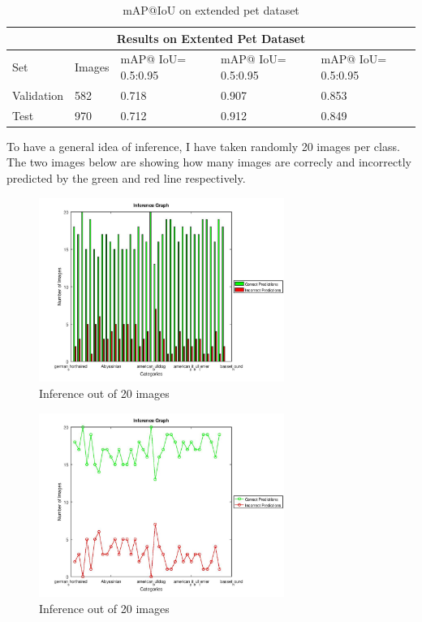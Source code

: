 \documentclass[10pt,twocolumn,letterpaper]{article}
\begin{document}
\begin{table}[h]
\begin{tabular}{ |p{1.5cm}||p{1cm}|p{1cm}|p{1cm}|p{1cm}|  }
 \hline
 \multicolumn{5}{|c|}{Results on Extented Pet Dataset} \\
 \hline
 Set & Images & mAP@ IoU= 0.5:0.95 & mAP@ IoU= 0.5:0.95 &mAP@ IoU= 0.5:0.95 \\
 \hline
 Validation & 582 & 0.718 & 0.907 & 0.853\\
 \hline
 Test & 970 & 0.712 & 0.912 & 0.849\\
 \hline
\end{tabular}
\caption{mAP@IoU on extended pet dataset}
\end{table}

To have a general idea of inference, I have taken randomly 20 images per class. The two images below are showing how many images are correcly and incorrectly predicted by the green and red line respectively.

\begin{figure}[h]
\caption{Inference out of 20 images}
\includegraphics[width=8cm]{images/inference_bar_plot.jpg}
\centering
\end{figure}

\begin{figure}[h]
\caption{Inference out of 20 images}
\includegraphics[width=8cm]{images/inference_scatter_plot.jpg}
\centering
\end{figure}
\end{document}
